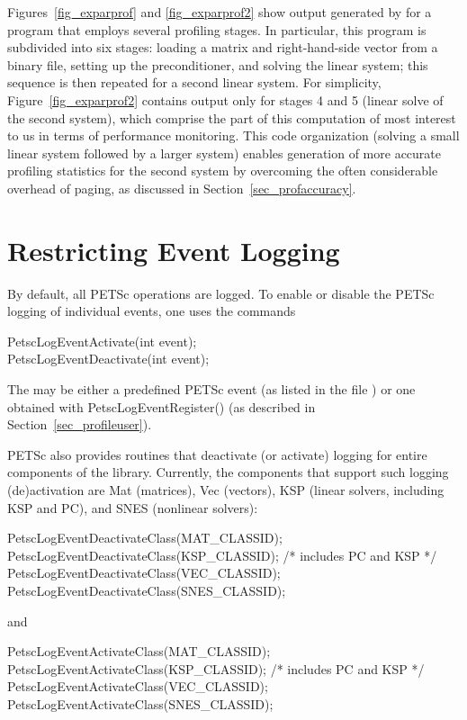 {{Figures~\ref{fig_exparprof} and \ref{fig_exparprof2} show output
generated by  for a program that employs
several profiling stages.  In particular, this program is
subdivided into six stages: loading a matrix and right-hand-side
vector from a binary file, setting up the preconditioner, and solving
the linear system; this sequence is then repeated for a second linear
system.  For simplicity, Figure~\ref{fig_exparprof2} contains output
only for stages 4 and 5 (linear solve of the second system), which comprise
the part of this computation of most interest to us in terms of
performance monitoring.  This code organization (solving a small
linear system followed by a larger system) enables generation of more
accurate profiling statistics for the second system by overcoming the
often considerable overhead of paging, as discussed in
Section~\ref{sec_profaccuracy}.

\section{Restricting Event Logging}
\label{sec_deactivate}

By default, all PETSc operations are logged.
To enable or disable the PETSc logging of individual events, one uses the commands
\begin{tabbing}
   PetscLogEventActivate(int event);\\
   PetscLogEventDeactivate(int event);
\end{tabbing}
The  may be either a predefined PETSc event (as listed in
the file ) or one obtained with
PetscLogEventRegister() (as described in Section~\ref{sec_profileuser}).

PETSc also provides routines that deactivate (or activate)
logging for entire components of the library. Currently, the
components that support such logging (de)activation are Mat (matrices),
Vec (vectors), KSP (linear solvers, including KSP
and PC), and SNES (nonlinear solvers):
\begin{tabbing}
   PetscLogEventDeactivateClass(MAT\_CLASSID);\\
   PetscLogEventDeactivateClass(KSP\_CLASSID); /* includes PC and KSP */\\
   PetscLogEventDeactivateClass(VEC\_CLASSID);\\
   PetscLogEventDeactivateClass(SNES\_CLASSID);
\end{tabbing}
and
\begin{tabbing}
   PetscLogEventActivateClass(MAT\_CLASSID);\\
   PetscLogEventActivateClass(KSP\_CLASSID);   /* includes PC and KSP */\\
   PetscLogEventActivateClass(VEC\_CLASSID);\\
   PetscLogEventActivateClass(SNES\_CLASSID);
\end{tabbing}

}}
